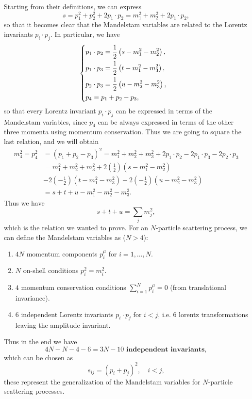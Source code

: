 Starting from their definitions, we can express
\[
    s = p_1^2 + p_2^2 + 2 p_1 \cdot p_2 = m_1^2 + m_2^2 + 2 p_1 \cdot p_2,
\]
so that it becomes clear that the Mandelstam variables are related to the Lorentz invariants \(p_i \cdot p_j\). In particular, we have
\[
    \begin{aligned}
         & \begin{dcases}
               p_1 \cdot p_2 = \frac{1}{2}\left( s - m_1^2 - m_2^2 \right), \\
               p_1 \cdot p_3 = \frac{1}{2}\left( t - m_1^2 - m_3^2 \right), \\
               p_2 \cdot p_3 = \frac{1}{2}\left( u - m_2^2 - m_3^2 \right), \\
               p_4 = p_1 + p_2 - p_3,
           \end{dcases}
    \end{aligned}
\]
so that every Lorentz invariant \(p_i \cdot p_j\) can be expressed in terms of the Mandelstam variables, since \(p_4\) can be always expressed in terms of the other three momenta using momentum conservation. Thus we are going to square the last relation, and we will obtain
\[
    \begin{aligned}
        m_4^2 = p_4^2 & = (p_1 + p_2 - p_3)^2 = m_1^2 + m_2^2 + m_3^2 + 2 p_1 \cdot p_2 - 2 p_1 \cdot p_3 - 2 p_2 \cdot p_3                            \\
                      & = m_1^2 + m_2^2 + m_3^2 + 2 \left(\tfrac{1}{2}\right)\left( s - m_1^2 - m_2^2 \right)                                          \\
                      & - 2 \left(-\tfrac{1}{2}\right)\left( t - m_1^2 - m_3^2 \right) - 2 \left(- \tfrac{1}{2}\right)\left( u - m_2^2 - m_3^2 \right) \\
                      & = s + t + u - m_1^2 - m_2^2 - m_3^2.
    \end{aligned}
\]
Thus we have
\[
    s + t + u = \sum_{j} m_j^2,
\]
which is the relation we wanted to prove. For an \(N\)-particle scattering process, we can define the Mandelstam variables as (\(N>4\)):
\begin{enumerate}
    \item \(4N\) momentum components \(p_i^\mu\) for \(i = 1, \dots, N\).
    \item \(N\) on-shell conditions \(p_i^2 = m_i^2\).
    \item \(4\) momentum conservation conditions \(\sum_{i=1}^N p_i^\mu = 0\) (from translational invariance).
    \item 6 independent Lorentz invariants \(p_i \cdot p_j\) for \(i < j\), i.e. 6 lorentz transformations leaving the amplitude invariant.
\end{enumerate}
Thus in the end we have
\[
    4N - N - 4 - 6 = 3N - 10 \textbf{ independent invariants},
\]
which can be chosen as
\[
    s_{ij} = (p_i + p_j)^2, \quad i < j,
\]
these represent the generalization of the Mandelstam variables for \(N\)-particle scattering processes.

